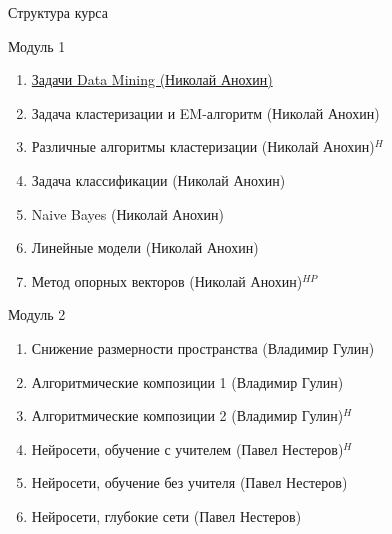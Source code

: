 \documentclass[10pt]{beamer}
\begin{document}
\begin{frame}{Структура курса}

{\small
Модуль 1
\begin{enumerate}
\item \underline{Задачи Data Mining (Николай Анохин)}
\item Задача кластеризации и EM-алгоритм (Николай Анохин)
\item Различные алгоритмы кластеризации (Николай Анохин){\color{red}$^{H}$}
\item Задача классификации (Николай Анохин)
\item Naive Bayes (Николай Анохин)
\item Линейные модели (Николай Анохин)
\item Метод опорных векторов (Николай Анохин){\color{red}$^{HP}$}
\end{enumerate}

Модуль 2
\begin{enumerate}
\item Снижение размерности пространства (Владимир Гулин)
\item Алгоритмические композиции 1 (Владимир Гулин)
\item Алгоритмические композиции 2 (Владимир Гулин){\color{red}$^{H}$}
\item Нейросети, обучение с учителем (Павел Нестеров){\color{red}$^{H}$}
\item Нейросети, обучение без учителя (Павел Нестеров)
\item Нейросети, глубокие сети (Павел Нестеров)
\end{enumerate}
}

\end{frame}
\end{document}
